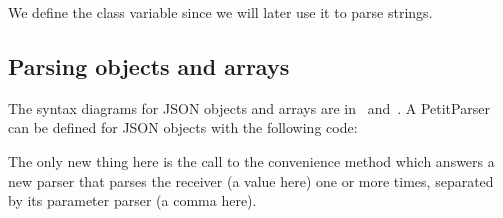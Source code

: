 \documentclass[a4paper,10pt,twoside]{book}
\begin{document}
We define the  class variable since we will later
use it to parse strings.

\subsection{Parsing objects and arrays}

The syntax diagrams for JSON objects and arrays are
in~ and~. A PetitParser can
be defined for JSON objects with the following code:


The only new thing here is the call to the 
convenience method which answers a new parser that parses the receiver
(a value here) one or more times, separated by its parameter parser (a
comma here).
\end{document}
